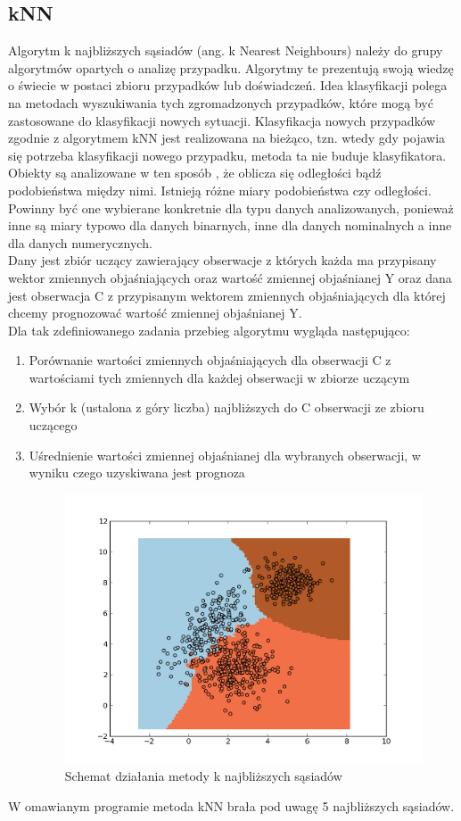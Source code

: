 \documentclass{article}
\begin{document}
\subsection{kNN}
Algorytm k najbliższych sąsiadów (ang. k Nearest Neighbours) należy do grupy algorytmów opartych o analizę przypadku. Algorytmy te prezentują swoją wiedzę o świecie w postaci zbioru przypadków lub doświadczeń. Idea klasyfikacji polega na metodach wyszukiwania tych zgromadzonych przypadków, które mogą być zastosowane do klasyfikacji nowych sytuacji. Klasyfikacja nowych przypadków zgodnie z algorytmem kNN jest realizowana na bieżąco, tzn. wtedy gdy pojawia się potrzeba klasyfikacji nowego przypadku, metoda ta nie buduje klasyfikatora. \\
Obiekty są analizowane w ten sposób , że oblicza się odległości bądź podobieństwa między nimi. Istnieją różne miary podobieństwa czy odległości. Powinny być one wybierane konkretnie dla typu danych analizowanych, ponieważ inne są miary typowo dla danych binarnych, inne dla danych nominalnych a inne dla danych numerycznych.\\
Dany jest zbiór uczący zawierający obserwacje z których każda ma przypisany wektor zmiennych objaśniających oraz wartość zmiennej objaśnianej Y oraz dana jest obserwacja C z przypisanym wektorem zmiennych objaśniających dla której chcemy prognozować wartość zmiennej objaśnianej Y.\\
Dla tak zdefiniowanego zadania przebieg algorytmu wygląda następująco:
\begin{enumerate}
\item Porównanie wartości zmiennych objaśniających dla obserwacji C z wartościami tych zmiennych dla każdej obserwacji w zbiorze uczącym
\item Wybór k (ustalona z góry liczba) najbliższych do C obserwacji ze zbioru uczącego
\item Uśrednienie wartości zmiennej objaśnianej dla wybranych obserwacji, w wyniku czego uzyskiwana jest prognoza
\begin{figure}[htp]
	\centering
	\includegraphics[width=1\textwidth]{Figures/knn.png}
	\caption{Schemat działania metody k najbliższych sąsiadów }
\end{figure}
\end{enumerate}
W omawianym programie metoda kNN brała pod uwagę 5 najbliższych sąsiadów.
\end{document}
